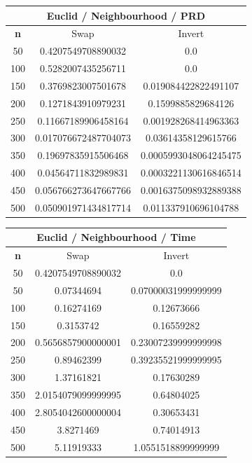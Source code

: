 \documentclass{article}
\begin{document}
\begin{center}
\begin{tabular}{|c|c|c|}
\hline
\multicolumn{3}{|c|}{\textbf{Euclid / Neighbourhood / PRD}}\\
\hline
\textbf{n} & Swap & Invert\\
\hline
50 & 0.4207549708890032 & 0.0\\
\hline
100 & 0.5282007435256711 & 0.0\\
\hline
150 & 0.3769823007501678 & 0.019084422822491107\\
\hline
200 & 0.1271843910979231 & 0.1599885829684126\\
\hline
250 & 0.11667189906458164 & 0.001928268414963363\\
\hline
300 & 0.017076672487704073 & 0.03614358129615766\\
\hline
350 & 0.19697835915506468 & 0.0005993048064245475\\
\hline
400 & 0.04564711832989831 & 0.0003221130616846514\\
\hline
450 & 0.056766273647667766 & 0.0016375098932889388\\
\hline
500 & 0.050901971434817714 & 0.011337910696104788\\
\hline
\end{tabular}
\end{center}


\begin{center}
\begin{tabular}{|c|c|c|}
\hline
\multicolumn{3}{|c|}{\textbf{Euclid / Neighbourhood / Time}}\\
\hline
\textbf{n} & Swap & Invert\\
\hline
50 & 0.4207549708890032 & 0.0\\
\hline
50 & 0.07344694 & 0.07000031999999999\\
\hline
100 & 0.16274169 & 0.12673666\\
\hline
150 & 0.3153742 & 0.16559282\\
\hline
200 & 0.5656857900000001 & 0.23007239999999998\\
\hline
250 & 0.89462399 & 0.39235521999999995\\
\hline
300 & 1.37161821 & 0.17630289\\
\hline
350 & 2.0154079099999995 & 0.64804025\\
\hline
400 & 2.8054042600000004 & 0.30653431\\
\hline
450 & 3.8271469 & 0.74014913\\
\hline
500 & 5.11919333 & 1.0551518899999999\\
\hline
\end{tabular}
\end{center}
\end{document}
